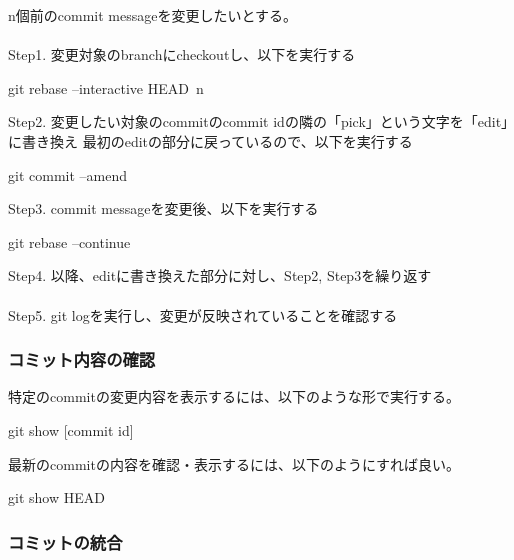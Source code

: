 \documentclass[10pt,a4j,openany,dvipdfmx]{jsarticle}
\begin{document}
\begin{tcolorbox}[skin=enhanced,
left=3mm,right=3mm,top=1mm,bottom=1mm, boxrule=1.0mm, 
title=2つ以上前のcommit messageの変更, coltitle=black, fonttitle=\bfseries, 
colback=SpringGreen!5!white,colframe=SpringGreen!70]
n個前のcommit messageを変更したいとする。\\
\\
Step1. 変更対象のbranchにcheckoutし、以下を実行する
\begin{commandshell}
git rebase --interactive HEAD~n
\end{commandshell}

Step2. 変更したい対象のcommitのcommit idの隣の「pick」という文字を「edit」に書き換え
最初のeditの部分に戻っているので、以下を実行する
\begin{commandshell}
git commit --amend
\end{commandshell}

Step3. commit messageを変更後、以下を実行する
\begin{commandshell}
git rebase --continue
\end{commandshell}

Step4. 以降、editに書き換えた部分に対し、Step2, Step3を繰り返す\\
\\
Step5. git logを実行し、変更が反映されていることを確認する
\end{tcolorbox}


\subsubsection{コミット内容の確認} %
\label{ssub:コミット内容の確認}

特定のcommitの変更内容を表示するには、以下のような形で実行する。
\begin{commandshell}
git show [commit id]
\end{commandshell}

最新のcommitの内容を確認・表示するには、以下のようにすれば良い。
\begin{commandshell}
git show HEAD
\end{commandshell}

\subsubsection{コミットの統合} %
\label{ssub:コミットの統合}
\end{document}
